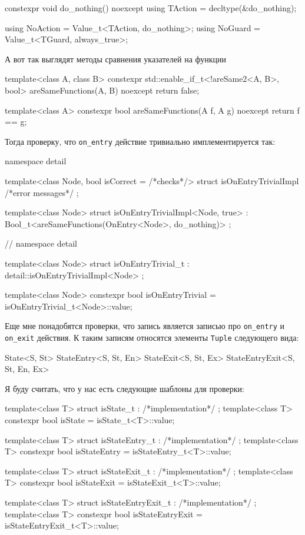 \documentclass{article}
\begin{document}
{\begin{cppcode}
constexpr void do_nothing() noexcept {
}
using TAction = decltype(&do_nothing);

using NoAction = Value_t<TAction, do_nothing>;
using NoGuard = Value_t<TGuard, always_true>;
\end{cppcode}
А вот так выглядят методы сравнения указателей на функции
\begin{cppcode}
template<class A, class B>
constexpr std::enable_if_t<!areSame2<A, B>, bool> areSameFunctions(A,
                                                                   B) noexcept {
  return false;
}

template<class A>
constexpr bool areSameFunctions(A f, A g) noexcept {
  return f == g;
}
\end{cppcode}
Тогда проверку, что \verb"on_entry" действие тривиально имплементируется так:
\begin{cppcode}
namespace detail {
template<class Node, bool isCorrect = /*checks*/>
struct isOnEntryTrivialImpl {
  /*error messages*/
};

template<class Node>
struct isOnEntryTrivialImpl<Node, true> : Bool_t<areSameFunctions(OnEntry<Node>, do_nothing)> {};
} // namespace detail

template<class Node>
struct isOnEntryTrivial_t : detail::isOnEntryTrivialImpl<Node> {};

template<class Node>
constexpr bool isOnEntryTrivial = isOnEntryTrivial_t<Node>::value;
\end{cppcode}

Еще мне понадобятся проверки, что запись является записью про \verb"on_entry" и \verb"on_exit" действия.
К таким записям относятся элементы \verb"Tuple" следующего вида:
\begin{cppcode}
State<S, St>
StateEntry<S, St, En>
StateExit<S, St, Ex>
StateEntryExit<S, St, En, Ex>
\end{cppcode}
Я буду считать, что у нас есть следующие шаблоны для проверки:
\begin{cppcode}
template<class T>
struct isState_t : /*implementation*/ {};
template<class T>
constexpr bool isState = isState_t<T>::value;

template<class T>
struct isStateEntry_t : /*implementation*/ {};
template<class T>
constexpr bool isStateEntry = isStateEntry_t<T>::value;

template<class T>
struct isStateExit_t : /*implementation*/ {};
template<class T>
constexpr bool isStateExit = isStateExit_t<T>::value;

template<class T>
struct isStateEntryExit_t : /*implementation*/ {};
template<class T>
constexpr bool isStateEntryExit = isStateEntryExit_t<T>::value;


\end{cppcode}}
\end{document}
